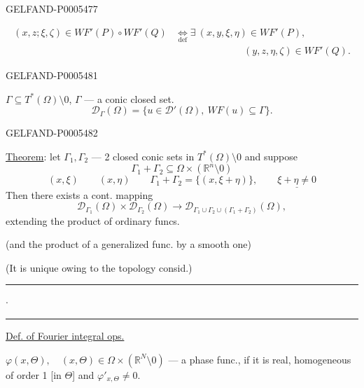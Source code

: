 \begin{GelfandAdjacentEvidence}{GELFAND-P000547}{7}

\[
\begin{aligned}
(x,z;\xi,\zeta)\in WF'(P)\circ WF'(Q)
&\underset{\mathrm{def}}{\Longleftrightarrow}
\exists\ (x,y,\xi,\eta)\in WF'(P),\\
&\hspace{7em}(y,z,\eta,\zeta)\in WF'(Q).
\end{aligned}
\]
\end{GelfandAdjacentEvidence}



\begin{GelfandAdjacentEvidence}{GELFAND-P000548}{1}

\(\Gamma\subseteq T^*(\Omega)\setminus0\), \(\Gamma\) — a conic closed set.
\[
\mathcal D_\Gamma(\Omega)=\{u\in\mathcal D'(\Omega),\ WF(u)\subseteq\Gamma\}.
\]
\end{GelfandAdjacentEvidence}
\begin{GelfandAdjacentEvidence}{GELFAND-P000548}{2}

\uline{Theorem}: let \(\Gamma_1,\Gamma_2\) — 2 closed conic sets in
\(T^*(\Omega)\setminus0\) and suppose
\[
\Gamma_1+\Gamma_2\subseteq\Omega\times(\mathbb R^n\setminus0)
\]
\[
(x,\xi)\qquad(x,\eta)\qquad
\Gamma_1+\Gamma_2=\{(x,\xi+\eta)\},\qquad\underline{\xi+\eta\ne0}
\]
Then there exists a cont. mapping
\[
\mathcal D_{\Gamma_1}(\Omega)\times\mathcal D_{\Gamma_2}(\Omega)
\longrightarrow\mathcal D_{\Gamma_1\cup\Gamma_2\cup(\Gamma_1+\Gamma_2)}(\Omega),
\]
extending the product of ordinary funcs.

(and the product of a generalized func. by a smooth one)

(It is unique owing to the topology consid.)
\hfill\rule{1.3cm}{.35pt}\enspace\(\cdot\)\enspace\rule{1.3cm}{.35pt}\par

\uline{Def. of Fourier integral ops.}

\(\varphi(x,\Theta),\quad (x,\Theta)\in\Omega\times(\mathbb R^N\setminus0)\)
— a phase func., if it is real, homogeneous of order 1 [in \(\Theta\)] and
\(\varphi'_{x,\Theta}\ne0\).
\end{GelfandAdjacentEvidence}
